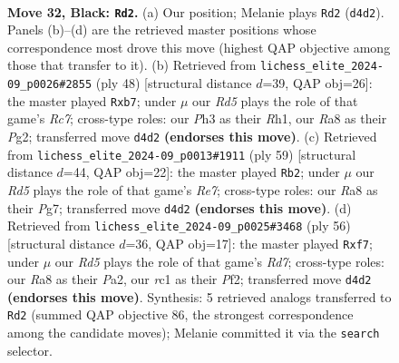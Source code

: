 \documentclass[11pt]{article}
\begin{document}
\clearpage

\begin{figure}[p]\centering
\begin{subfigure}{0.46\textwidth}\centering
\resizebox{\linewidth}{!}{%
\newchessgame
\chessboard[
  setfen={r7/pp3pk1/8/7p/bP1rP3/P5Pp/5P2/RBR3K1 b - - 1 32},
  showmover=false,
  pgfstyle=straightmove, color=movearrow, markmove={d4-d2}
]}
\caption{}
\end{subfigure}\hfill
\begin{subfigure}{0.46\textwidth}\centering
\resizebox{\linewidth}{!}{%
\newchessgame
\chessboard[
  setfen={r5k1/1pR3pp/p3Pb2/3r4/1P6/P3B3/5PPP/4K2R w K - 2 25},
  showmover=false,
  pgfstyle=straightmove, color=movearrow, markmove={c7-b7}
]}
\caption{}
\end{subfigure}
\\[4pt]
\begin{subfigure}{0.46\textwidth}\centering
\resizebox{\linewidth}{!}{%
\newchessgame
\chessboard[
  setfen={1b4k1/6pp/pB6/P7/1p6/1P6/4rPPP/R5K1 b - - 0 30},
  showmover=false,
  pgfstyle=straightmove, color=movearrow, markmove={e2-b2}
]}
\caption{}
\end{subfigure}\hfill
\begin{subfigure}{0.46\textwidth}\centering
\resizebox{\linewidth}{!}{%
\newchessgame
\chessboard[
  setfen={r4b2/p2R1p2/1k5p/1p6/5pP1/7P/PPP2P2/6K1 w - - 0 29},
  showmover=false,
  pgfstyle=straightmove, color=movearrow, markmove={d7-f7}
]}
\caption{}
\end{subfigure}
\caption{\textbf{Move 32, Black: \texttt{Rd2}.} (a) Our position; Melanie plays \texttt{Rd2} (\texttt{d4d2}). Panels (b)--(d) are the retrieved master positions whose correspondence most drove this move (highest QAP objective among those that transfer to it). (b) Retrieved from \texttt{lichess\_elite\_2024-09\_p0026\#2855} (ply 48) [structural distance $d$=39, QAP obj=26]: the master played \texttt{Rxb7}; under $\mu$ our \emph{Rd5} plays the role of that game's \emph{Rc7}; cross-type roles: our \emph{P}h3 as their \emph{R}h1, our \emph{R}a8 as their \emph{P}g2; transferred move \texttt{d4d2} \textbf{(endorses this move)}. (c) Retrieved from \texttt{lichess\_elite\_2024-09\_p0013\#1911} (ply 59) [structural distance $d$=44, QAP obj=22]: the master played \texttt{Rb2}; under $\mu$ our \emph{Rd5} plays the role of that game's \emph{Re7}; cross-type roles: our \emph{R}a8 as their \emph{P}g7; transferred move \texttt{d4d2} \textbf{(endorses this move)}. (d) Retrieved from \texttt{lichess\_elite\_2024-09\_p0025\#3468} (ply 56) [structural distance $d$=36, QAP obj=17]: the master played \texttt{Rxf7}; under $\mu$ our \emph{Rd5} plays the role of that game's \emph{Rd7}; cross-type roles: our \emph{R}a8 as their \emph{P}a2, our \emph{r}c1 as their \emph{P}f2; transferred move \texttt{d4d2} \textbf{(endorses this move)}. Synthesis: 5 retrieved analogs transferred to \texttt{Rd2} (summed QAP objective 86, the strongest correspondence among the candidate moves); Melanie committed it via the \texttt{search} selector.}
\label{fig:thought-m63}
\end{figure}
\end{document}
